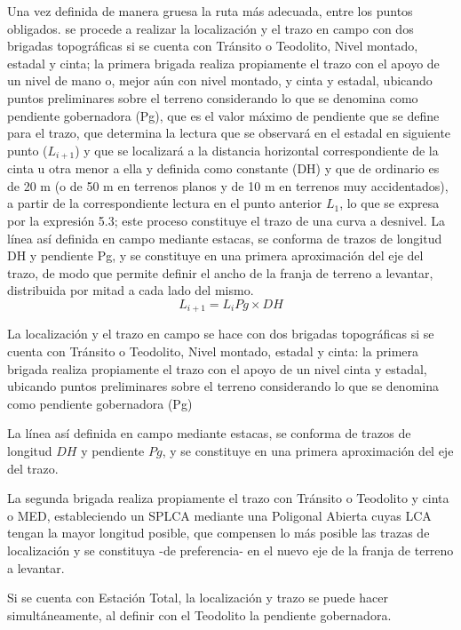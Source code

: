 Una vez definida de manera gruesa la ruta más adecuada, entre los puntos obligados. se procede a realizar la localización y el trazo en campo con dos brigadas topográficas si se cuenta con Tránsito o Teodolito, Nivel montado, estadal y cinta; la primera brigada realiza propiamente el trazo con el apoyo de un nivel de mano o, mejor aún con nivel montado, y cinta y estadal, ubicando puntos preliminares sobre el terreno considerando lo que se denomina como pendiente gobernadora (Pg), que es el valor máximo de pendiente que se define para el trazo, que determina la lectura que se observará en el estadal en
siguiente punto ($L_{i+1}$) y que se localizará a la distancia horizontal correspondiente de la cinta u otra menor a ella y definida como constante (DH) y que de ordinario es de 20 m (o de 50 m en terrenos planos y de 10 m en terrenos muy accidentados), a partir de la correspondiente lectura en el punto anterior $L_1$, lo que se expresa por la expresión 5.3; este proceso constituye el trazo de una curva a desnivel. La línea así definida en campo mediante estacas, se conforma de trazos de longitud DH y pendiente Pg, y se constituye en una primera aproximación del eje del trazo, de modo que permite definir el ancho de la franja de terreno a levantar, distribuida por mitad a cada lado del mismo.
\begin{equation}
    L_{i+ 1}= L_i Pg\times DH
\end{equation}

La localización y el trazo en campo se hace con dos brigadas topográficas si se cuenta con Tránsito o Teodolito, Nivel montado, estadal y cinta: la primera brigada realiza propiamente el trazo con el apoyo de un nivel cinta y estadal, ubicando puntos preliminares sobre el terreno considerando lo que se denomina como pendiente gobernadora (Pg)

La línea así definida en campo mediante estacas, se conforma de trazos de longitud $DH$ y pendiente $Pg$, y se constituye en una primera aproximación del eje del trazo.

La segunda brigada realiza propiamente el trazo con Tránsito o Teodolito y cinta o MED, estableciendo un SPLCA mediante una Poligonal Abierta cuyas LCA tengan la mayor longitud posible, que compensen lo más posible las trazas de localización y se constituya -de preferencia- en el nuevo eje de la franja de terreno a levantar.

Si se cuenta con Estación Total, la localización y trazo se puede hacer simultáneamente, al definir con el Teodolito la pendiente gobernadora.

